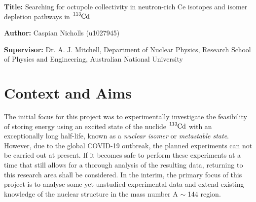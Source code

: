 \documentclass[12pt,a4paper]{article}
\begin{document}

\noindent
\textbf{Title: }Searching for octupole collectivity in neutron-rich Ce isotopes and isomer depletion pathways in $\ce{^{113}Cd}$

\noindent
\textbf{Author: } Caspian Nicholls (u1027945)

\noindent
\textbf{Supervisor: } Dr. A. J. Mitchell, Department of Nuclear Physics, Research School of Physics and Engineering, Australian National University

%
%

\section*{Context and Aims}

The initial focus for this project was to experimentally investigate the feasibility of storing energy using an excited state of the nuclide $\ce{^{113}Cd}$ with an exceptionally long half-life, known as a \textit{nuclear isomer} or \textit{metastable state}.
However, due to the global COVID-19 outbreak, the planned experiments can not be carried out at present.
If it becomes safe to perform these experiments at a time that still allows for a thorough analysis of the resulting data, returning to this research area shall be considered.
In the interim, the primary focus of this project is to analyse some yet unstudied experimental data and extend existing knowledge of the nuclear structure in the mass number A $\sim$ 144 region.
\end{document}
